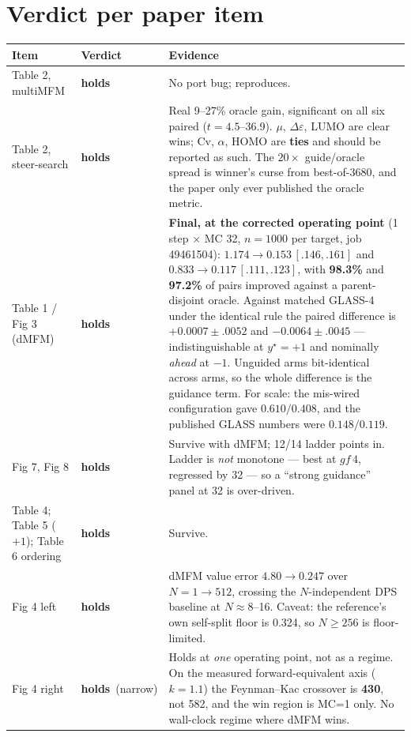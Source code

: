 \documentclass[10pt]{article}
\newcommand{\Y}{\textcolor{ok}{\textbf{holds}}}
\begin{document}
\section{Verdict per paper item}

\begin{longtable}{@{}p{3.4cm}p{1.6cm}p{10.2cm}@{}}
\toprule
\textbf{Item} & \textbf{Verdict} & \textbf{Evidence} \\
\midrule
\endhead
Table 2, multiMFM & \Y & No port bug; reproduces. \\
Table 2, steer-search & \Y & Real 9--27\% oracle gain, significant on all six paired
  ($t=4.5$--36.9). $\mu$, $\Delta\varepsilon$, LUMO are clear wins; Cv, $\alpha$, HOMO are
  \textbf{ties} and should be reported as such. The $20\times$ guide/oracle spread is winner's
  curse from best-of-3680, and the paper only ever published the oracle metric. \\
Table 1 / Fig 3 (dMFM) & \Y & \textbf{Final, at the corrected operating point} (1 step
  $\times$ MC 32, $n{=}1000$ per target, job 49461504): $1.174\!\to\!\mathbf{0.153}\,[.146,.161]$
  and $0.833\!\to\!\mathbf{0.117}\,[.111,.123]$, with \textbf{98.3\%} and \textbf{97.2\%} of pairs
  improved against a parent-disjoint oracle. Against matched GLASS-4 under the identical rule the
  paired difference is $+0.0007\pm.0052$ and $\mathbf{-0.0064\pm.0045}$ --- indistinguishable at
  $y^\star{=}{+}1$ and nominally \emph{ahead} at $-1$. Unguided arms bit-identical across arms, so
  the whole difference is the guidance term. For scale: the mis-wired configuration gave
  $0.610/0.408$, and the published GLASS numbers were $0.148/0.119$. \\
Fig 7, Fig 8 & \Y & Survive with dMFM; 12/14 ladder points in. Ladder is \emph{not} monotone ---
  best at $gf\,4$, regressed by 32 --- so a ``strong guidance'' panel at 32 is over-driven. \\
Table 4; Table 5 ($+1$); Table 6 ordering & \Y & Survive. \\
Fig 4 left & \Y & dMFM value error $4.80\!\to\!0.247$ over $N{=}1\!\to\!512$, crossing the
  $N$-independent DPS baseline at $N\!\approx\!8$--16. Caveat: the reference's own self-split floor
  is 0.324, so $N\!\ge\!256$ is floor-limited. \\
Fig 4 right & \Y\ (narrow) & Holds at \emph{one} operating point, not as a regime. On the measured
  forward-equivalent axis ($k{=}1.1$) the Feynman--Kac crossover is \textbf{430}, not 582, and the
  win region is MC=1 only. No wall-clock regime where dMFM wins. \\

\end{longtable}
\end{document}
